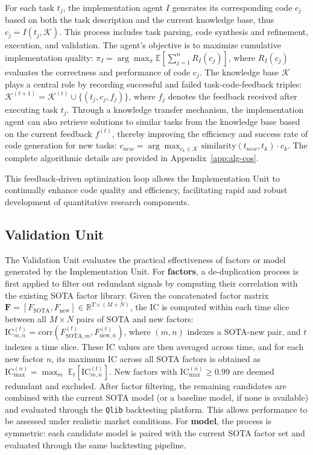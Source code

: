 \documentclass{article}
\begin{document}
For each task $t_j$, the implementation agent $I$ generates its corresponding code $c_j$ based on both the task description and the current knowledge base, thus $c_j = I(t_j, \mathcal{K})$. This process includes task parsing, code synthesis and refinement, execution, and validation. The agent’s objective is to maximize cumulative implementation quality: $
\pi_I = \arg\max_{\pi} \mathbb{E} \left[ \sum_{j=1}^{n} R_I(c_j) \right]
$, where $R_I(c_j)$ evaluates the correctness and performance of code $c_j$.
The knowledge base $\mathcal{K}$ plays a central role by recording successful and failed task-code-feedback triples: $\mathcal{K}^{(t+1)} = \mathcal{K}^{(t)} \cup \{ (t_j, c_j, f_j) \}$, where $f_j$ denotes the feedback received after executing task $t_j$. Through a knowledge transfer mechanism, the implementation agent can also retrieve solutions to similar tasks from the knowledge base based on the current feedback $f^{(t)}$, thereby improving the efficiency and success rate of code generation for new tasks: $c_{new} = \arg\max_{c_k \in \mathcal{K}} \text{similarity}(t_{new}, t_k) \cdot c_k$.
The complete algorithmic details are provided in Appendix~\ref{app:alg-cos}.

This feedback-driven optimization loop allows the Implementation Unit to continually enhance code quality and efficiency, facilitating rapid and robust development of quantitative research components.

\subsection{Validation Unit} \label{valu}
The Validation Unit evaluates the practical effectiveness of factors or model generated by the Implementation Unit.
For \textbf{factors}, a de-duplication process is first applied to filter out redundant signals by computing their correlation with the existing SOTA factor library.
Given the concatenated factor matrix $\mathbf{F} = [F_{\text{SOTA}}, F_{\text{new}}] \in \mathbb{R}^{T \times (M+N)}$, the IC is computed within each time slice between all $M \times N$ pairs of SOTA and new factors: $ \text{IC}_{m,n}^{(t)} = \text{corr}(F_{\text{SOTA}, m}^{(t)}, F_{\text{new}, n}^{(t)})$, where $(m, n)$ indexes a SOTA-new pair, and $t$ indexes a time slice.
These IC values are then averaged across time, and for each new factor $n$, its maximum IC across all SOTA factors is obtained as $\text{IC}_{\max}^{(n)} = \max_{m} \; \mathbb{E}_t \left[ \text{IC}_{m,n}^{(t)} \right]$.
New factors with $\text{IC}_{\max}^{(n)} \geq 0.99$ are deemed redundant and excluded.
After factor filtering, the remaining candidates are combined with the current SOTA model (or a baseline model, if none is available) and evaluated through the \texttt{Qlib} backtesting platform. This allows performance to be assessed under realistic market conditions. For \textbf{model}, the process is symmetric: each candidate model is paired with the current SOTA factor set and evaluated through the same backtesting pipeline.
\end{document}
